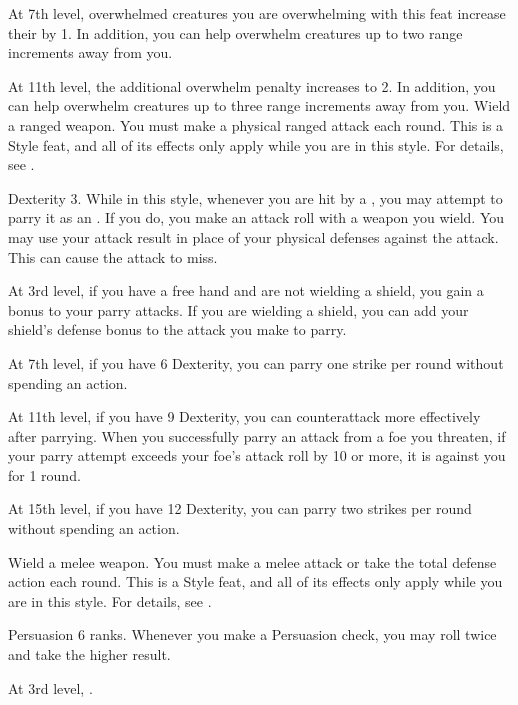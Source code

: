     At 7th level, overwhelmed creatures you are overwhelming with this feat increase their  by 1.
    In addition, you can help overwhelm creatures up to two range increments away from you.

    At 11th level, the additional overwhelm penalty increases to 2.
    In addition, you can help overwhelm creatures up to three range increments away from you.
    \stylereq Wield a ranged weapon.
    You must make a physical ranged attack each round.
     This is a Style feat, and all of its effects only apply while you are in this style.
    For details, see .

    \featpre Dexterity 3.
    \featben While in this style, whenever you are hit by a , you may attempt to parry it as an .
    If you do, you make an attack roll with a weapon you wield.
    You may use your attack result in place of your physical defenses against the attack.
    This can cause the attack to miss.

    At 3rd level, if you have a free hand and are not wielding a shield, you gain a  bonus to your parry attacks.
    If you are wielding a shield, you can add your shield's defense bonus to the attack you make to parry.

    At 7th level, if you have 6 Dexterity, you can parry one strike per round without spending an action.

    At 11th level, if you have 9 Dexterity, you can counterattack more effectively after parrying.
    When you successfully parry an attack from a foe you threaten, if your parry attempt exceeds your foe's attack roll by 10 or more, it is  against you for 1 round.

    At 15th level, if you have 12 Dexterity, you can parry two strikes per round without spending an action.

    \stylereq Wield a melee weapon.
    You must make a melee attack or take the total defense action each round.
     This is a Style feat, and all of its effects only apply while you are in this style.
    For details, see .

    \featpre Persuasion 6 ranks.
    \featben Whenever you make a Persuasion check, you may roll twice and take the higher result.

    At 3rd level, \tdash.

